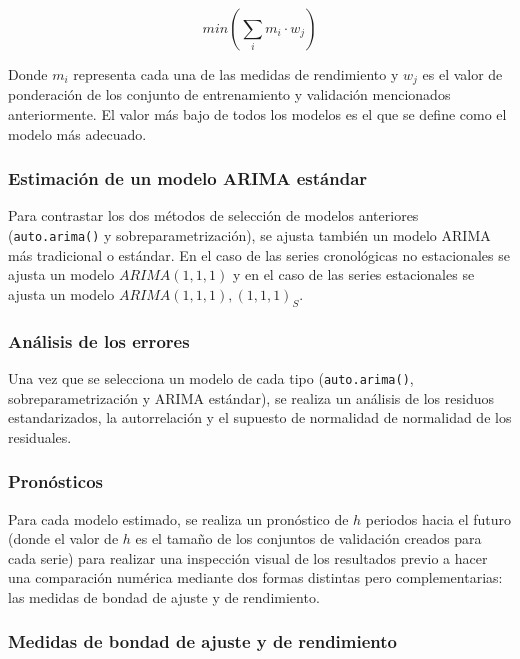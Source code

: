 \documentclass[
]{article}
\begin{document}
\begin{equation}
\label{eqn:concenso}
min\left( \sum_i {m_i}\cdot w_j \right)
\end{equation}

Donde \(m_i\) representa cada una de las medidas de rendimiento y
\(w_j\) es el valor de ponderación de los conjunto de entrenamiento y
validación mencionados anteriormente. El valor más bajo de todos los
modelos es el que se define como el modelo más adecuado.

\subsubsection{Estimación de un modelo ARIMA estándar}

Para contrastar los dos métodos de selección de modelos anteriores
(\texttt{auto.arima()} y sobreparametrización), se ajusta también un
modelo ARIMA más tradicional o estándar. En el caso de las series
cronológicas no estacionales se ajusta un modelo \(ARIMA(1,1,1)\) y en
el caso de las series estacionales se ajusta un modelo
\(ARIMA(1,1,1),(1,1,1)_S\).

\subsubsection{Análisis de los errores}

Una vez que se selecciona un modelo de cada tipo (\texttt{auto.arima()},
sobreparametrización y ARIMA estándar), se realiza un análisis de los
residuos estandarizados, la autorrelación y el supuesto de normalidad de
normalidad de los residuales.

\subsubsection{Pronósticos}

Para cada modelo estimado, se realiza un pronóstico de \(h\) periodos
hacia el futuro (donde el valor de \(h\) es el tamaño de los conjuntos
de validación creados para cada serie) para realizar una inspección
visual de los resultados previo a hacer una comparación numérica
mediante dos formas distintas pero complementarias: las medidas de
bondad de ajuste y de rendimiento.

\subsubsection{Medidas de bondad de ajuste y de rendimiento}
\end{document}
